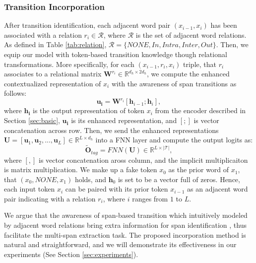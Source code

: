 \documentclass[a4paper]{cas-sc}
\newcommand{\1}[1]{\mathds{1}\left[#1\right]}
\newcommand{\secref}[1]{Section \ref{#1}}
\newcommand{\tableref}[1]{Table \ref{#1}}
\begin{document}
\subsubsection{Transition Incorporation}
After transition identification, each adjacent word pair $(x_{i-1}, x_{i})$ has been associated with a relation $r_i \in \mathcal{R}$, where $\mathcal{R}$ is the set of adjacent word relations. As defined in  \tableref{tab:relation}, $\mathcal{R} = \{NONE, In, Intra, Inter, Out\}$. Then, we equip our model with 
token-based transition knowledge though relational transformations.
More specifically, for each $(x_{i-1}, r_i, x_i)$ triple, 
that $r_i$ associates to a relational matrix $\mathbf{W}^{r_i}\in \mathbb{R}^{d_h\times 2d_h}$,
we compute the enhanced contextualized representation of $x_i$
with the awareness of span transitions as follows: 
\begin{equation}\label{eq:matrix}
	\mathbf{u_i}=\mathbf{W}^{r_i} \left[ \mathbf{h}_{i-1}; \mathbf{h}_i \right], 
\end{equation}
where $\mathbf{h_i}$ is the output representation of token $x_i$ 
from the encoder described in \secref{sec:basic}, 
$\mathbf{u_i}$ is its enhanced representation, 
and $[;]$ is vector concatenation across row.
Then, we send the enhanced representations $\mathbf{U} = [\mathbf{u}_1, \mathbf{u}_2, ..., \mathbf{u}_L] \in \mathbb{R}^{L\times d_h}$ into a FNN layer and compute the output logits as:
\begin{equation}\label{eq:enhanced}
	\mathbf{\widetilde{O}}_{tag}=FNN(\mathbf{U})\in \mathbb{R}^{L\times|\mathcal{T}|},
\end{equation}
where $[, ]$ is vector concatenation aross column, and 
the implicit multiplicaiton is matrix multiplication.
We make up a fake token $x_0$ as the prior word of $x_1$, that $(x_0, NONE, x_1)$ holds, and $\mathbf{h}_0$ is set to be a vector full of zeros. Hence, each input token $x_i$ can be paired with its prior token $x_{i-1}$ as an adjacent word pair indicating with a relation $r_i$, where $i$ ranges from $1$ to $L$.

We argue that the awareness of span-based transition which intuitively modeled by adjacent word relations bring extra information for span identification%
, thus facilitate the multi-span extraction task.
The proposed incorporation method is natural and straightforward, 
and we will demonstrate its effectiveness in our experiments
(See \secref{sec:experiments}).
\end{document}
